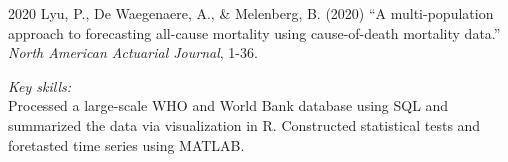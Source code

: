 \documentclass[12pt,letterpaper]{report}
\begin{document}
    \begin{tablist}
    	\item[2020] \tab Lyu, P., De Waegenaere, A., \& Melenberg, B. (2020) \enquote{A multi-population approach to forecasting all-cause mortality using cause-of-death mortality data.} \textit{North American Actuarial Journal}, 1-36. %
    	\medskip
    	
%    	
    	
    	\textit{Key skills:}\\
		Processed a large-scale WHO and World Bank database using SQL and summarized the data via visualization in R. Constructed statistical tests and foretasted time series using MATLAB. 


    	
%    	
    	

\end{tablist}
\end{document}
